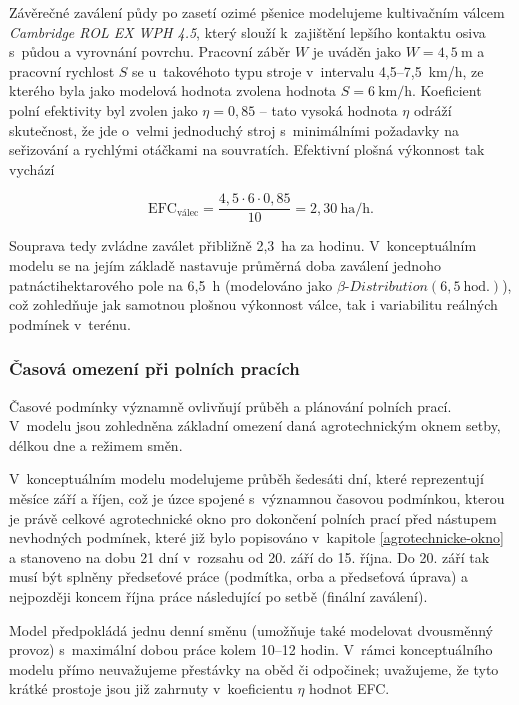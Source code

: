 \documentclass[11pt,a4paper]{article}
\newcounter{subsubsubsection}[subsubsection]
\begin{document}

Závěrečné zaválení půdy po zasetí ozimé pšenice modelujeme kultivačním válcem \emph{Cambridge ROL EX WPH 4.5}\cite{eshop-zp-kultivační-válec}, který slouží k~zajištění lepšího kontaktu osiva s~půdou a vyrovnání povrchu. Pracovní záběr $W$ je uváděn jako $W = 4,5~\text{m}$ a pracovní rychlost $S$ se u~takovéhoto typu stroje v~intervalu 4,5--7,5~km/h, ze kterého byla jako modelová hodnota zvolena hodnota $S = 6~\text{km/h}$. Koeficient polní efektivity byl zvolen jako $\eta = 0,85$ -- tato vysoká hodnota $\eta$ odráží skutečnost, že jde o~velmi jednoduchý stroj s~minimálními požadavky na seřizování a rychlými otáčkami na souvratích. Efektivní plošná výkonnost tak vychází

$$
\text{EFC}_{\text{válec}} = \frac{4,5 \cdot 6 \cdot 0,85}{10} = 2,30~\text{ha/h}.
$$

Souprava tedy zvládne zaválet přibližně 2,3~ha za hodinu. V~konceptuálním modelu se na jejím základě nastavuje průměrná doba zaválení jednoho patnáctihektarového pole na 6,5~h (modelováno jako $\beta\text{-}Distribution(6,5~\text{hod.})$), což zohledňuje jak samotnou plošnou výkonnost válce, tak i variabilitu reálných podmínek v~terénu.

\subsubsection{Časová omezení při polních pracích}

Časové podmínky významně ovlivňují průběh a plánování polních prací. V~modelu jsou zohledněna základní omezení daná agrotechnickým oknem setby, délkou dne a režimem směn.

V~konceptuálním modelu modelujeme průběh šedesáti dní, které reprezentují měsíce září a říjen, což je úzce spojené s~významnou časovou podmínkou, kterou je právě celkové agrotechnické okno pro dokončení polních prací před nástupem nevhodných podmínek, které již bylo popisováno v~kapitole \ref{agrotechnicke-okno} a stanoveno na dobu 21 dní v~rozsahu od 20. září do 15. října\cite{wikifarmer-kdy-pěstovat}. Do 20. září tak musí být splněny předseťové práce (podmítka, orba a předseťová úprava) a nejpozději koncem října práce následující po setbě (finální zaválení).
 
Model předpokládá jednu denní směnu (umožňuje také modelovat dvousměnný provoz) s~maximální dobou práce kolem 10--12 hodin. V~rámci konceptuálního modelu přímo neuvažujeme přestávky na oběd či odpočinek; uvažujeme, že tyto krátké prostoje jsou již zahrnuty v~koeficientu $\eta$ hodnot EFC. 
\end{document}
